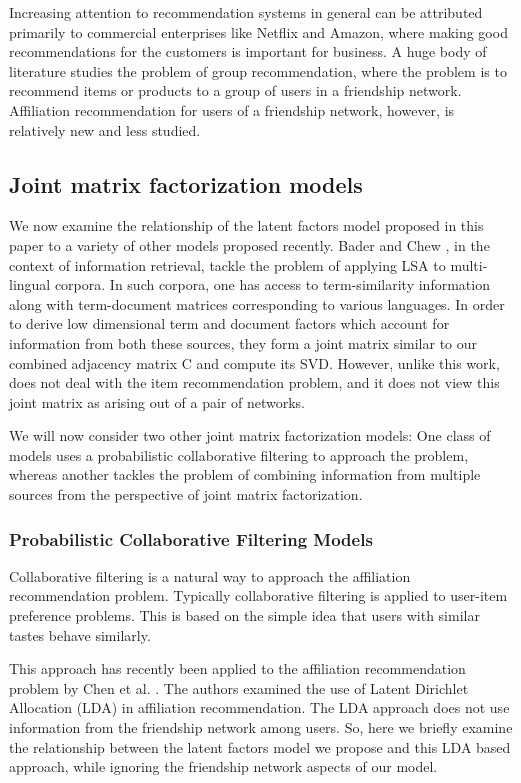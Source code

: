 Increasing attention to recommendation systems in general can be attributed primarily to commercial enterprises like Netflix and Amazon, where making good recommendations for the customers is important for business. A huge body of literature studies the problem of group recommendation, where the problem is to recommend items or products to a group of users in a friendship network.  Affiliation recommendation for users of a friendship network, however, is relatively new and less studied.

\subsection{Joint matrix factorization models}
We now examine the relationship of the latent factors model proposed in this paper to a variety of other models proposed recently. Bader and Chew \cite{baderChew08}, in the context of information retrieval, tackle the problem of applying LSA to multi-lingual corpora. In such corpora, one has access to term-similarity information along with term-document matrices corresponding to various languages. In order to derive low dimensional term and document factors which account for information from both these sources, they form a joint matrix similar to our combined adjacency matrix C and compute its SVD. However, unlike this work, \cite{baderChew08} does not deal with the item recommendation problem, and it does not view this joint matrix as arising out of a pair of networks.

We will now consider two other joint matrix factorization models: One class of models uses a probabilistic collaborative filtering to approach the problem, whereas another tackles the problem of combining information from multiple sources from the perspective of joint matrix factorization.

\subsubsection{Probabilistic Collaborative Filtering Models}
Collaborative filtering is a natural way to approach the affiliation recommendation problem. Typically collaborative filtering is applied to user-item preference problems. This is based on the simple idea that users with similar tastes behave similarly.

This approach has recently been applied to the affiliation recommendation problem by Chen et al. \cite{GoogleCFLatent}. The authors examined the use of Latent Dirichlet Allocation (LDA) in affiliation recommendation. The LDA approach does not use information from the friendship network among users. So, here we briefly examine the relationship between the latent factors model we propose and this LDA based approach, while ignoring the friendship network aspects of our model.

